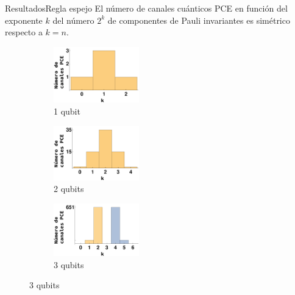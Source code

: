 \documentclass[xcolor=dvipsnames,presentation]{beamer}%
\begin{document}
\begin{frame}{Resultados}{Regla espejo}
El número de canales cuánticos PCE en función del exponente $k$ del 
número $2^k$ de componentes de Pauli invariantes es simétrico respecto a 
$k=n$.

	\begin{figure} %
	\centering
	\begin{subfigure}[b]{0.48\textwidth}
		\centering
		\includegraphics[width=3.7cm]{mirroring_1qubits}
		\caption{1 qubit}
		\label{fig:mirroring_1qubit}
	\end{subfigure}
	\hfill
	\begin{subfigure}[b]{0.48\textwidth}
		\centering
		\hfill 
		\includegraphics[width=3.7cm]{mirroring_2qubits} 
		\hfill \hfill
		\caption{2 qubits}
		\label{fig:mirroring_2qubits}
	\end{subfigure}
	\newline
	\begin{subfigure}[c]{\textwidth}
		\centering
		\hspace*{\fill}
		\includegraphics[width=3.7cm]{mirroring_3qubits}
		\hspace*{\fill}
		\caption{3 qubits}
		\label{fig:mirroring_3qubits}
	\end{subfigure}
	\label{fig:mirroring}
\end{figure} %
\end{frame}
\end{document}
